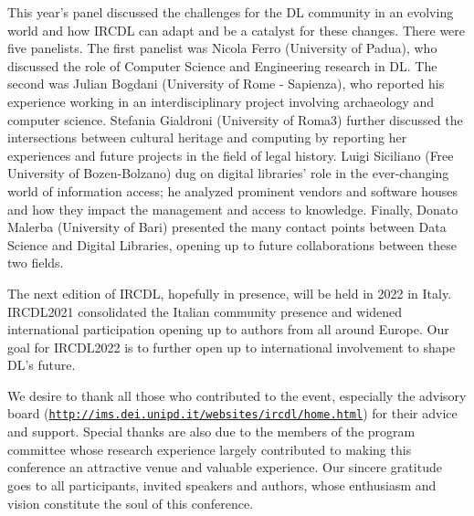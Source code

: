\documentclass[sigconf, nonacm]{acmart}
\begin{document}
This year's panel discussed the challenges for the DL community in an evolving world and how IRCDL can adapt and be a catalyst for these changes. There were five panelists. The first panelist was Nicola Ferro (University of Padua), who discussed the role of Computer Science and Engineering research in DL. The second was Julian Bogdani (University of Rome - Sapienza), who reported his experience working in an interdisciplinary project involving archaeology and computer science. Stefania Gialdroni (University of Roma3) further discussed the intersections between cultural heritage and computing by reporting her experiences and future projects in the field of legal history. Luigi Siciliano (Free University of Bozen-Bolzano) dug on digital libraries' role in the ever-changing world of information access; he analyzed prominent vendors and software houses and how they impact the management and access to knowledge. Finally, Donato Malerba (University of Bari) presented the many contact points between Data Science and Digital Libraries, opening up to future collaborations between these two fields. 

The next edition of IRCDL, hopefully in presence, will be held in 2022 in Italy. IRCDL2021 consolidated the Italian community presence and widened international participation opening up to authors from all around Europe. Our goal for IRCDL2022 is to further open up to international involvement to shape DL's future. 


\begin{acks}
We desire to thank all those who contributed to the
event, especially the advisory board (\texttt{\url{http://ims.dei.unipd.it/websites/ircdl/home.html}}) for their advice and support. Special thanks
are also due to the members of the program committee whose research experience largely contributed
to making this conference an attractive venue and
valuable experience. Our sincere gratitude goes to
all participants, invited speakers and authors, whose
enthusiasm and vision constitute the soul of this
conference.
\end{acks}



\end{document}
